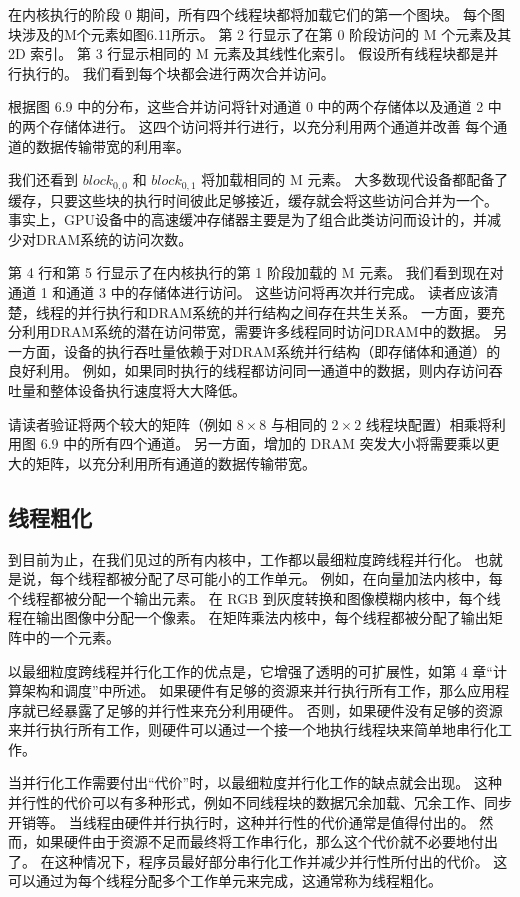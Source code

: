 在内核执行的阶段 0 期间，所有四个线程块都将加载它们的第一个图块。 每个图块涉及的M个元素如图6.11所示。 
第 2 行显示了在第 0 阶段访问的 M 个元素及其 2D 索引。 第 3 行显示相同的 M 元素及其线性化索引。 
假设所有线程块都是并行执行的。 我们看到每个块都会进行两次合并访问。

根据图 6.9 中的分布，这些合并访问将针对通道 0 中的两个存储体以及通道 2 中的两个存储体进行。
这四个访问将并行进行，以充分利用两个通道并改善 每个通道的数据传输带宽的利用率。

我们还看到 $block_{0,0}$ 和 $block_{0,1}$ 将加载相同的 M 元素。 
大多数现代设备都配备了缓存，只要这些块的执行时间彼此足够接近，缓存就会将这些访问合并为一个。 
事实上，GPU设备中的高速缓冲存储器主要是为了组合此类访问而设计的，并减少对DRAM系统的访问次数。

第 4 行和第 5 行显示了在内核执行的第 1 阶段加载的 M 元素。 我们看到现在对通道 1 和通道 3 中的存储体进行访问。
这些访问将再次并行完成。 读者应该清楚，线程的并行执行和DRAM系统的并行结构之间存在共生关系。 
一方面，要充分利用DRAM系统的潜在访问带宽，需要许多线程同时访问DRAM中的数据。 
另一方面，设备的执行吞吐量依赖于对DRAM系统并行结构（即存储体和通道）的良好利用。 
例如，如果同时执行的线程都访问同一通道中的数据，则内存访问吞吐量和整体设备执行速度将大大降低。

请读者验证将两个较大的矩阵（例如 $8 \times 8$ 与相同的 $2 \times 2$ 线程块配置）相乘将利用图 6.9 中的所有四个通道。 
另一方面，增加的 DRAM 突发大小将需要乘以更大的矩阵，以充分利用所有通道的数据传输带宽。

\subsection{线程粗化}
到目前为止，在我们见过的所有内核中，工作都以最细粒度跨线程并行化。 也就是说，每个线程都被分配了尽可能小的工作单元。 
例如，在向量加法内核中，每个线程都被分配一个输出元素。 
在 RGB 到灰度转换和图像模糊内核中，每个线程在输出图像中分配一个像素。 
在矩阵乘法内核中，每个线程都被分配了输出矩阵中的一个元素。

以最细粒度跨线程并行化工作的优点是，它增强了透明的可扩展性，如第 4 章“计算架构和调度”中所述。 
如果硬件有足够的资源来并行执行所有工作，那么应用程序就已经暴露了足够的并行性来充分利用硬件。 
否则，如果硬件没有足够的资源来并行执行所有工作，则硬件可以通过一个接一个地执行线程块来简单地串行化工作。

当并行化工作需要付出“代价”时，以最细粒度并行化工作的缺点就会出现。 
这种并行性的代价可以有多种形式，例如不同线程块的数据冗余加载、冗余工作、同步开销等。 
当线程由硬件并行执行时，这种并行性的代价通常是值得付出的。 
然而，如果硬件由于资源不足而最终将工作串行化，那么这个代价就不必要地付出了。 
在这种情况下，程序员最好部分串行化工作并减少并行性所付出的代价。 
这可以通过为每个线程分配多个工作单元来完成，这通常称为线程粗化。

